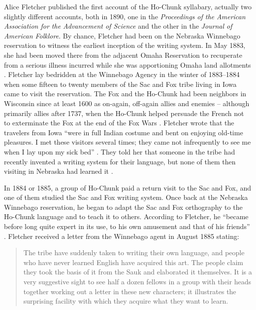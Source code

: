 \documentclass[output=paper]{LSP/langsci}
\begin{document}
Alice Fletcher published the first account of the Ho-Chunk syllabary, actually two slightly different accounts, both in 1890, one in the \emph{Proceedings of the American Association for the Advancement of Science} and the other in the \emph{Journal of American Folklore}. By chance, Fletcher had been on the Nebraska Winnebago reservation to witness the earliest inception of the writing system. In May 1883, she had been moved there from the adjacent Omaha Reservation to recuperate from a serious illness incurred while she was apportioning Omaha land allotments \citep[90]{Mark1988}. Fletcher lay bedridden at the Winnebago Agency in the winter of 1883--1884 when some fifteen to twenty members of the Sac and Fox tribe living in Iowa came to visit the reservation. The Fox and the Ho-Chunk had been neighbors in Wisconsin since at least 1600 as on-again, off-again allies and enemies -- although primarily allies after 1737, when the Ho-Chunk helped persuade the French not to exterminate the Fox at the end of the Fox Wars \citep[75]{Bieder1995}. Fletcher wrote that the travelers from Iowa ``were in full Indian costume and bent on enjoying old-time pleasures. I met these visitors several times; they came not infrequently to see me when I lay upon my sick bed'' \citeyearpar[354]{Fletcher1890b}. They told her that someone in the tribe had recently invented a writing system for their language, but none of them then visiting in Nebraska had learned it \citeyearpar[299]{Fletcher1890a}.

In 1884 or 1885, a group of Ho-Chunk paid a return visit to the Sac and Fox, and one of them studied the Sac and Fox writing system. Once back at the Nebraska Winnebago reservation, he began to adapt the Sac and Fox orthography to the Ho-Chunk language and to teach it to others. According to Fletcher, he ``became before long quite expert in its use, to his own amusement and that of his friends'' \citeyearpar[299]{Fletcher1890a}. Fletcher received a letter from the Winnebago agent in August 1885 stating:

\begin{quote}
The tribe have suddenly taken to writing their own language, and people who have never learned English have acquired this art. The people claim they took the basis of it from the Sauk and elaborated it themselves. It is a very suggestive sight to see half a dozen fellows in a group with their heads together working out a letter in these new characters; it illustrates the surprising facility with which they acquire what they want to learn. \citeyearpar[299]{Fletcher1890a}
\end{quote}
\end{document}
